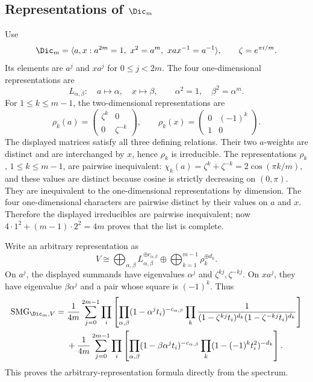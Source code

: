 \documentclass[10pt]{article}
\newcommand{\SMG}{\operatorname{SMG}}
\begin{document}
\subsection{Representations of \texorpdfstring{$\Dic_m$}{Dic-m}}
Use
\[
 \Dic_m=\langle a,x:a^{2m}=1,\ x^2=a^m,\ xax^{-1}=a^{-1}\rangle,
 \qquad \zeta=e^{\pi i/m}.
\]
Its elements are $a^j$ and $xa^j$ for $0\le j<2m$.
The four one-dimensional representations are
\[
 L_{\alpha,\beta}:\quad a\mapsto\alpha,\quad x\mapsto\beta,
 \qquad \alpha^2=1,\quad\beta^2=\alpha^m.
\]
For $1\le k\le m-1$, the two-dimensional representations are
\[
 \rho_k(a)=\begin{pmatrix}\zeta^k&0\\0&\zeta^{-k}\end{pmatrix},\qquad
 \rho_k(x)=\begin{pmatrix}0&(-1)^k\\1&0\end{pmatrix}.
\]
The displayed matrices satisfy all three defining relations.  Their two
$a$-weights are distinct and are interchanged by $x$, hence $\rho_k$ is
irreducible.  The representations $\rho_k$, $1\leq k\leq m-1$, are pairwise
inequivalent: $\chi_k(a)=\zeta^k+\zeta^{-k}=2\cos(\pi k/m)$, and these values
are distinct because cosine is strictly decreasing on $(0,\pi)$.  They are
inequivalent to the one-dimensional representations by dimension.  The four
one-dimensional characters are pairwise distinct by their values on $a$ and
$x$.  Therefore the displayed irreducibles are pairwise inequivalent; now
$4\cdot1^2+(m-1)\cdot2^2=4m$ proves that the list is complete.

Write an arbitrary representation as
\[
 V\cong\bigoplus_{\alpha,\beta}L_{\alpha,\beta}^{\oplus c_{\alpha,\beta}}
 \oplus\bigoplus_{k=1}^{m-1}\rho_k^{\oplus d_k}.
\]
On $a^j$, the displayed summands have eigenvalues $\alpha^j$ and
$\zeta^{kj},\zeta^{-kj}$.  On $xa^j$, they have eigenvalue
$\beta\alpha^j$ and a pair whose square is $(-1)^k$.  Thus
\begin{align*}
\SMG_{\Dic_m,V}
={}&\frac1{4m}\sum_{j=0}^{2m-1}\prod_i
 \left[\prod_{\alpha,\beta}(1-\alpha^jt_i)^{-c_{\alpha,\beta}}
 \prod_k\frac1{(1-\zeta^{kj}t_i)^{d_k}(1-\zeta^{-kj}t_i)^{d_k}}\right]\\
&+\frac1{4m}\sum_{j=0}^{2m-1}\prod_i
 \left[\prod_{\alpha,\beta}(1-\beta\alpha^jt_i)^{-c_{\alpha,\beta}}
 \prod_k(1-(-1)^kt_i^2)^{-d_k}\right].
\end{align*}
This proves the arbitrary-representation formula directly from the spectrum.
\end{document}
